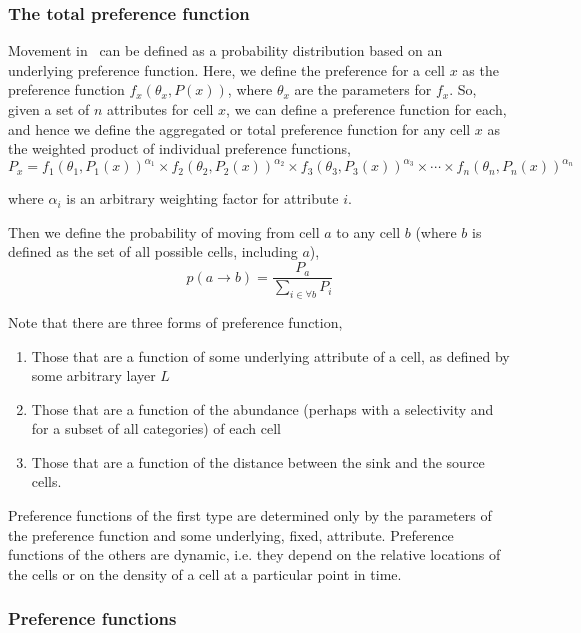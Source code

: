 \subsubsection*{The total preference function}

Movement in \SPM\ can be defined as a probability distribution based on an underlying preference function. Here, we define the preference for a cell $x$ as the preference function $f_x(\theta_x,P(x))$, where $\theta_x$ are the parameters for $f_x$. So, given a set of $n$ attributes for cell $x$, we can define a preference function for each, and hence we define the aggregated or total preference function for any cell $x$ as the weighted product of individual preference functions,
\begin{equation}
  P_x=f_1(\theta_1,P_1(x))^{\alpha_1} \times f_2(\theta_2,P_2(x))^{\alpha_2} \times f_3(\theta_3,P_3(x))^{\alpha_3} \times \cdots \times f_n(\theta_n,P_n(x))^{\alpha_n}
\end{equation}

where $\alpha_i$ is an arbitrary weighting factor for attribute $i$.

Then we define the probability of moving from cell $a$ to any cell $b$ (where $b$ is defined as the set of all possible cells, including $a$),
\begin{equation}
  p(a\rightarrow b) = \frac{P_a}{\sum\limits_{i \in \forall b} P_i}
\end{equation}

Note that there are three forms of preference function,
\begin{enumerate}
\item Those that are a function of some underlying attribute of a cell, as defined by some arbitrary layer $L$
\item Those that are a function of the abundance (perhaps with a selectivity and for a subset of all categories) of each cell
\item Those that are a function of the distance between the sink and the source cells. 
\end{enumerate} 

Preference functions of the first type are determined only by the parameters of the preference function and some underlying, fixed, attribute. Preference functions of the others are dynamic, i.e. they depend on the relative locations of the cells or on the density of a cell at a particular point in time.

\subsubsection*{Preference functions}

